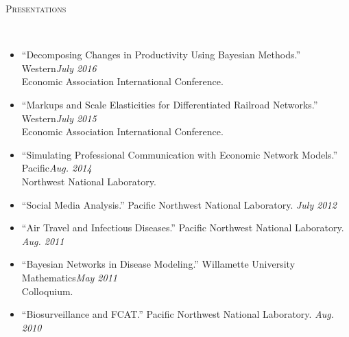 \documentclass[11pt]{article}
\newenvironment{changemargin}[2]{%
  \begin{list}{}{%
    \setlength{\topsep}{0pt}%
    \setlength{\leftmargin}{#1}%
    \setlength{\rightmargin}{#2}%
    \setlength{\listparindent}{\parindent}%
    \setlength{\itemindent}{\parindent}%
    \setlength{\parsep}{\parskip}%
  }%
  \item[]}{\end{list}
}
\newcommand{\lineover}{
	\begin{changemargin}{-0.05in}{-0.05in}
		\vspace*{-8pt}
		\hrulefill \\
		\vspace*{-2pt}
	\end{changemargin}
}
\newcommand{\header}[1]{
	\begin{changemargin}{-0.5in}{-0.5in}
		\scshape{#1}\\
  	\lineover
	\end{changemargin}
}
\newenvironment{body} {
	\vspace*{-16pt}
	\begin{changemargin}{-0.25in}{-0.5in}
  }	
	{\end{changemargin}
}
\begin{document}
\smallskip
\header{Presentations}

\begin{body}
	\vspace{14pt}
	\begin{itemize}
		\item ``Decomposing Changes in Productivity Using Bayesian Methods.'' Western\hfill \emph{July 2016}\\ Economic Association International Conference.
		\item ``Markups and Scale Elasticities for Differentiated Railroad Networks.'' Western\hfill \emph{July 2015}\\ Economic Association International Conference. 
		\item ``Simulating Professional Communication with Economic Network Models.'' Pacific\hfill \emph{Aug. 2014}\\ Northwest National Laboratory. 
		\item ``Social Media Analysis.'' Pacific Northwest National Laboratory. \hfill \emph{July 2012}
		\item ``Air Travel and Infectious Diseases.'' Pacific Northwest National Laboratory. \hfill \emph{Aug. 2011}
		\item ``Bayesian Networks in Disease Modeling.'' Willamette University Mathematics\hfill \emph{May 2011}\\ Colloquium.
		\item ``Biosurveillance and FCAT.'' Pacific Northwest National Laboratory. \hfill \emph{Aug. 2010}
	\end{itemize}
\end{body}
\end{document}
